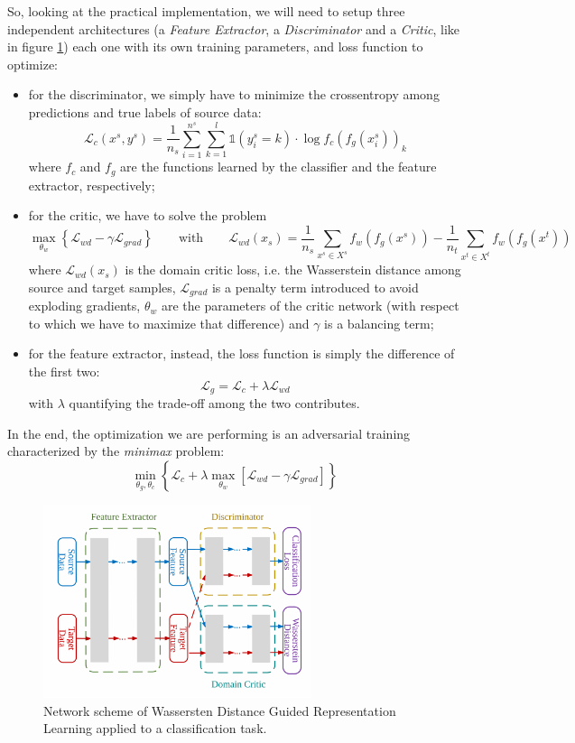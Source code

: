 \documentclass[../main.tex]{subfiles}
\begin{document}
So, looking at the practical implementation, we will need to setup three independent architectures (a \textit{Feature Extractor}, a \textit{Discriminator} and a \textit{Critic}, like in figure \ref{fig:wdgrl_scheme}) each one with its own training parameters, and loss function to optimize:
\begin{itemize}
	\item for the discriminator, we simply have to minimize the crossentropy among predictions and true labels of source data:
	\[ \mathscr{L}_c(x^s, y^s) = \frac{1}{n_s}\sum_{i=1}^{n^s}\sum_{k=1}^{l}\mathds{1}(y_i^s=k) \cdot\log f_c(f_g(x_i^s))_k \]
	where $f_c$ and $f_g$ are the functions learned by the classifier and the feature extractor, respectively;
	\item for the critic, we have to solve the problem
	\[ \max_{\theta_w}\left\{\mathscr{L}_{wd} - \gamma\mathscr{L}_{grad}\right\}  \qquad\text{with}\qquad \mathscr{L}_{wd}(x_s) = \frac{1}{n_s}\sum_{x^s\in X^s}f_w(f_g(x^s)) -  \frac{1}{n_t}\sum_{x^t\in X^t}f_w(f_g(x^t)) \]
	where $\mathscr{L}_{wd}(x_s)$ is the domain critic loss, i.e. the Wasserstein distance among source and target samples, $\mathscr{L}_{grad}$ is a penalty term introduced to avoid exploding gradients, $\theta_w$ are the parameters of the critic network (with respect to which we have to maximize that difference) and $\gamma$ is a balancing term;
	\item for the feature extractor, instead, the loss function is simply the difference of the first two:
	\[ \mathscr{L}_{g} = \mathscr{L}_{c} + \lambda\mathscr{L}_{wd}  \]
	with $\lambda$ quantifying the trade-off among the two contributes.
\end{itemize}
In the end, the optimization we are performing is an adversarial training characterized by the \textit{minimax} problem:
\[ \min_{\theta_g,\theta_c}\left\{\mathscr{L}_{c}+\lambda\max_{\theta_w}\left[\mathscr{L}_{wd}-\gamma\mathscr{L}_{grad}\right]\right\} \]


\begin{figure}[!ht]
	\centering
	\includegraphics[width=0.7\textwidth]{pictures/wdgrl_scheme}
	\caption{Network scheme of Wassersten Distance Guided Representation Learning applied to a classification task.}
	\label{fig:wdgrl_scheme}
\end{figure}
\end{document}
